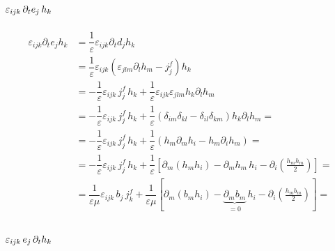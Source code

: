 \documentclass[letterpaper,10pt,english]{jupyterBook}
\begin{document}
\subsubsection*{\protect\(\varepsilon_{ijk} \, \partial_t e_j \, h_k\protect\)}
\begin{equation*}
\begin{split}\begin{aligned}
  \varepsilon_{ijk} \partial_t e_j h_k
  & = \dfrac{1}{\varepsilon} \varepsilon_{ijk} \partial_t d_j h_k \\
  & = \dfrac{1}{\varepsilon} \varepsilon_{ijk} \left(\varepsilon_{jlm} \partial_l h_m - j^f_j \right) h_k \\
  & = - \dfrac{1}{\varepsilon} \varepsilon_{ijk} \, j^f_j \, h_k + \dfrac{1}{\varepsilon} \varepsilon_{ijk} \varepsilon_{jlm} h_k \partial_l h_m \\
  & = - \dfrac{1}{\varepsilon} \varepsilon_{ijk} \, j^f_j \, h_k + \dfrac{1}{\varepsilon} \left( \delta_{im} \delta_{kl} - \delta_{il} \delta_{km} \right) h_k \partial_l h_m =  \\
  & = - \dfrac{1}{\varepsilon} \varepsilon_{ijk} \, j^f_j \, h_k + \dfrac{1}{\varepsilon} \left( h_m \partial_m h_i - h_m \partial_i h_m \right) =  \\
  & = - \dfrac{1}{\varepsilon} \varepsilon_{ijk} \, j^f_j \, h_k + \dfrac{1}{\varepsilon} \left[ \partial_m ( h_m  h_i ) - \partial_m h_m \, h_i - \partial_i \left( \frac{h_m h_m}{2} \right) \right] =  \\
  & = \dfrac{1}{\varepsilon \mu} \varepsilon_{ijk} \, b_j \, j^f_k + \dfrac{1}{\varepsilon \mu} \left[ \partial_m ( b_m  h_i ) - \underbrace{\partial_m b_m}_{=0} \, h_i - \partial_i \left( \frac{h_m b_m}{2} \right) \right] =  \\
\end{aligned}\end{split}
\end{equation*}\subsubsection*{\protect\(\varepsilon_{ijk} \, e_j \, \partial_t h_k\protect\)}
\end{document}
